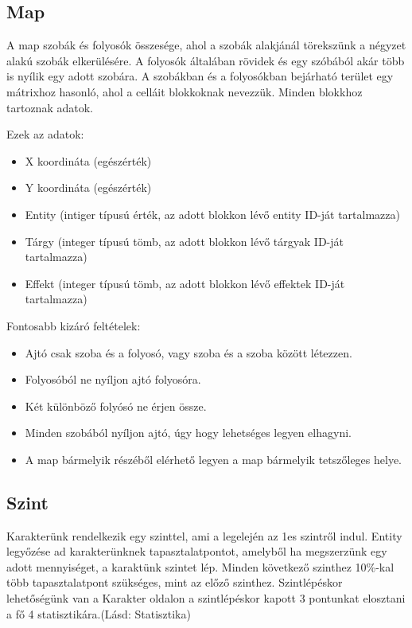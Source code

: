 \subsection{Map}

A map szobák és folyosók összesége, ahol a szobák alakjánál törekszünk a négyzet alakú szobák elkerülésére. A folyosók általában rövidek és egy szóbából akár több is nyílik egy adott szobára.
A szobákban és a folyosókban bejárható terület egy mátrixhoz hasonló, ahol a celláit blokkoknak nevezzük.
Minden blokkhoz tartoznak adatok.

Ezek az adatok:

\begin{itemize}
    \item X koordináta (egészérték)
    \item Y koordináta (egészérték)
    \item Entity (intiger típusú érték,  az adott blokkon lévő entity ID-ját tartalmazza)
    \item Tárgy (integer típusú tömb, az adott blokkon lévő tárgyak ID-ját tartalmazza)
    \item Effekt (integer típusú tömb, az adott blokkon lévő effektek ID-ját tartalmazza)
\end{itemize}

Fontosabb kizáró feltételek:

\begin{itemize}
    \item Ajtó csak szoba és a folyosó, vagy szoba és a szoba között létezzen.
    \item Folyosóból ne nyíljon ajtó folyosóra.
    \item Két különböző folyósó ne érjen össze.
    \item Minden szobából nyíljon ajtó, úgy hogy lehetséges legyen elhagyni.
    \item A map bármelyik részéből elérhető legyen a map bármelyik tetszőleges helye.
\end{itemize}


\subsection{Szint}

Karakterünk rendelkezik egy szinttel, ami a legelején az 1es szintről indul.
Entity legyőzése ad karakterünknek tapasztalatpontot, amelyből ha megszerzünk egy adott mennyiséget, a karaktünk szintet lép.
Minden következő szinthez 10\%-kal több tapasztalatpont szükséges, mint az előző szinthez.
Szintlépéskor lehetőségünk van a Karakter oldalon a szintlépéskor kapott 3 pontunkat elosztani a fő 4 statisztikára.(Lásd: Statisztika)

